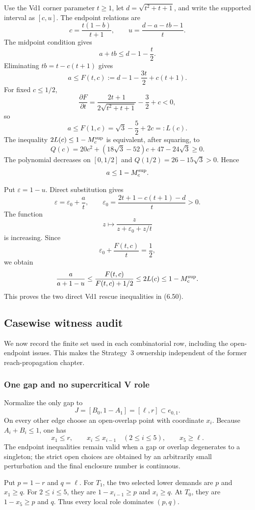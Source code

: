 Use the Vd1 corner parameter $t\ge1$, let
$d=\sqrt{t^2+t+1}$, and write the supported interval as $[c,u]$.  The endpoint
relations are
\[
 c=\frac{t(1-b)}{t+1},
 \qquad
 u=\frac{d-a-tb-1}{t}.
\]
The midpoint condition gives
\[
 a+tb\le d-1-\frac t2.
\]
Eliminating $tb=t-c(t+1)$ gives
\[
 a\le F(t,c):=d-1-\frac{3t}{2}+c(t+1).
\]
For fixed $c\le1/2$,
\[
 \frac{\partial F}{\partial t}
 =\frac{2t+1}{2\sqrt{t^2+t+1}}-\frac32+c<0,
\]
so
\[
 a\le F(1,c)=\sqrt3-\frac52+2c=:L(c).
\]
The inequality $2L(c)\le1-M_c^{\rm sup}$ is equivalent, after squaring, to
\[
 Q(c)=20c^2+(18\sqrt3-52)c+47-24\sqrt3\ge0.
\]
The polynomial decreases on $[0,1/2]$ and
$Q(1/2)=26-15\sqrt3>0$.  Hence
\[
 a\le1-M_c^{\rm sup}.
\]

Put $\varepsilon=1-u$.  Direct substitution gives
\[
 \varepsilon=\varepsilon_0+\frac at,
 \qquad
 \varepsilon_0=
 \frac{2t+1-c(t+1)-d}{t}>0.
\]
The function
\[
 z\longmapsto\frac{z}{z+\varepsilon_0+z/t}
\]
is increasing.  Since
\[
 \varepsilon_0+\frac{F(t,c)}t=\frac12,
\]
we obtain
\[
 \frac{a}{a+1-u}
 \le\frac{F(t,c)}{F(t,c)+1/2}
 \le2L(c)
 \le1-M_c^{\rm sup}.
\]
This proves the two direct Vd1 rescue inequalities in (6.50).

\subsection{Casewise witness audit}
\label{subsec:new-casewise-witness-details}

We now record the finite set used in each combinatorial row, including the
open-endpoint issues.  This makes the Strategy~3 ownership independent of the
former reach-propagation chapter.

\subsubsection{One gap and no supercritical V role}

Normalize the only gap to
\[
 J=[B_0,1-A_1]=[\ell,r]\subset e_{0,1}.
\]
On every other edge choose an open-overlap point with coordinate $x_i$.
Because $A_i+B_i\le1$, one has
\[
 x_1\le r,
 \qquad
 x_i\le x_{i-1}\quad(2\le i\le5),
 \qquad
 x_5\ge\ell.
 \tag{6.72}
\]
The endpoint inequalities remain valid when a gap or overlap degenerates to a
singleton; the strict open choices are obtained by an arbitrarily small
perturbation and the final enclosure number is continuous.

Put $p=1-r$ and $q=\ell$.  For $T_1$, the two selected lower demands are
$p$ and $x_1\ge q$.  For $2\le i\le5$, they are
$1-x_{i-1}\ge p$ and $x_i\ge q$.  At $T_0$, they are
$1-x_5\ge p$ and $q$.  Thus every local role dominates $(p,q)$.

